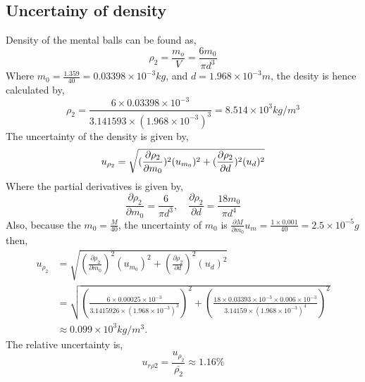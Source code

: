 \documentclass[12pt]{article}
\begin{document}
    \subsection{Uncertainy of density}
    Density of the mental balls can be found as,
    $$\rho_2 = \frac{m_o}{V} = \frac{6m_0}{\pi d^3}$$
    Where $m_0=\frac{1.359}{40}=0.03398\times10^{-3}kg$, and $d = 1.968 \times 10^{-3}m$, the desity is hence calculated by,
    $$\rho_2=\frac{6\times0.03398\times10^{-3}}{3.141593\times(1.968\times10^{-3})^3}=8.514\times10^{3}kg/m^3$$
    The uncertainty of the density is given by,
     \[
     u_{\rho_2}=\sqrt{(\frac{\partial\rho_2}{\partial m_0})^2(u_{m_0})^2+(\frac{\partial\rho_2}{\partial d})^2(u_d)^2}\\
    \]
    Where the partial derivatives is given by,
        \[
        \frac{\partial\rho_2}{\partial m_0}=\frac{6}{\pi d^3},\quad
        \frac{\partial\rho_2}{\partial d}=\frac{18m_0}{\pi d^4}
    \]
    Also, because the $m_{0} = \frac{M}{40}$, the uncertainty of $m_0$ is $\frac{\partial M}{\partial m_{0}}u_m=\frac{1\times0.001}{40}=2.5\times10^{-5}g$
    then,
    \[
    \begin{split}
        u_{\rho_2}&=\sqrt{(\frac{\partial\rho_2}{\partial m_0})^2(u_{m_0})^2+(\frac{\partial\rho_2}{\partial d})^2(u_d)^2}\\
        &=\sqrt{(\frac{6\times 0.00025\times10^{-3}}{3.1415926\times (1.968\times10^{-3})^3})^2+(\frac{18\times 0.03393\times10^{-3}\times 0.006\times10^{-3}}{3.14159\times (1.968\times10^{-3})^4})^2}\\
        &\approx 0.099 \times10^3kg/m^3.
    \end{split}
    \]
    The relative uncertainty is,
    $$u_{r\rho2} = \frac{u_{\rho_2}}{\bar{\rho_2}} \approx 1.16\% $$
\end{document}
